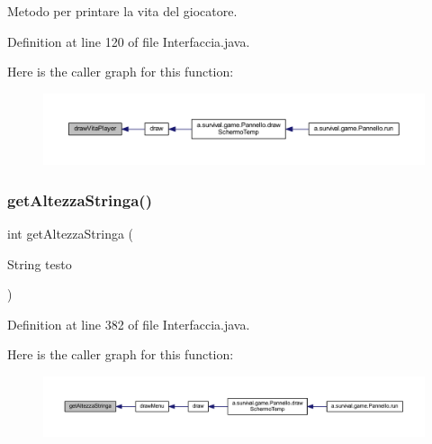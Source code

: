 Metodo per printare la vita del giocatore. 



Definition at line 120 of file Interfaccia.\+java.

Here is the caller graph for this function\+:
\nopagebreak
\begin{figure}[H]
\begin{center}
\leavevmode
\includegraphics[width=350pt]{classa_1_1survival_1_1game_1_1_interfaccia_a24697f9d9cd1d55fc26a7b7c0fd26697_icgraph}
\end{center}
\end{figure}
\mbox{\label{classa_1_1survival_1_1game_1_1_interfaccia_af3e544b837451de1ad271a8d32b61385}} 
\subsubsection{\texorpdfstring{get\+Altezza\+Stringa()}{getAltezzaStringa()}}
{\footnotesize\ttfamily int get\+Altezza\+Stringa (\begin{DoxyParamCaption}\item[{String}]{testo }\end{DoxyParamCaption})}



Definition at line 382 of file Interfaccia.\+java.

Here is the caller graph for this function\+:
\nopagebreak
\begin{figure}[H]
\begin{center}
\leavevmode
\includegraphics[width=350pt]{classa_1_1survival_1_1game_1_1_interfaccia_af3e544b837451de1ad271a8d32b61385_icgraph}
\end{center}
\end{figure}
\mbox{\label{classa_1_1survival_1_1game_1_1_interfaccia_a5e33eb51424c4888d0cd26cf5e0311de}} 
